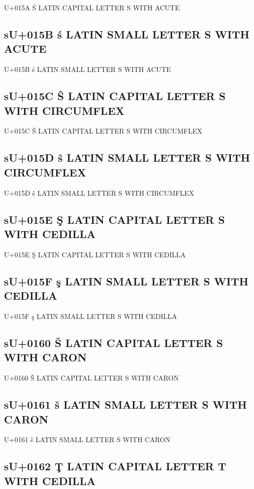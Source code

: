 U+015A Ś  LATIN CAPITAL LETTER S WITH ACUTE

\subsection{sU+015B ś  LATIN SMALL LETTER S WITH ACUTE}

U+015B ś  LATIN SMALL LETTER S WITH ACUTE

\subsection{sU+015C Ŝ  LATIN CAPITAL LETTER S WITH CIRCUMFLEX}

U+015C Ŝ  LATIN CAPITAL LETTER S WITH CIRCUMFLEX

\subsection{sU+015D ŝ  LATIN SMALL LETTER S WITH CIRCUMFLEX}

U+015D ŝ  LATIN SMALL LETTER S WITH CIRCUMFLEX

\subsection{sU+015E Ş  LATIN CAPITAL LETTER S WITH CEDILLA}

U+015E Ş  LATIN CAPITAL LETTER S WITH CEDILLA

\subsection{sU+015F ş  LATIN SMALL LETTER S WITH CEDILLA}

U+015F ş  LATIN SMALL LETTER S WITH CEDILLA

\subsection{sU+0160 Š  LATIN CAPITAL LETTER S WITH CARON}

U+0160 Š  LATIN CAPITAL LETTER S WITH CARON

\subsection{sU+0161 š  LATIN SMALL LETTER S WITH CARON}

U+0161 š  LATIN SMALL LETTER S WITH CARON

\subsection{sU+0162 Ţ  LATIN CAPITAL LETTER T WITH CEDILLA}

